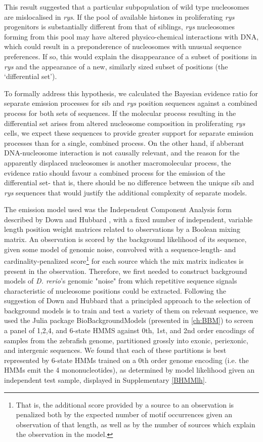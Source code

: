 This result suggested that a particular subpopulation of wild type nucleosomes are mislocalised in \textit{rys}. If the pool of available histones in proliferating \textit{rys} progenitors is substantially different from that of siblings, \textit{rys} nucleosomes forming from this pool may have altered physico-chemical interactions with DNA, which could result in a preponderence of nucleosomes with unusual sequence preferences. If so, this would explain the disappearance of a subset of positions in \textit{rys} and the appearance of a new, similarly sized subset of positions (the `differential set').

To formally address this hypothesis, we calculated the Bayesian evidence ratio for separate emission processes for sib and \textit{rys} position sequences against a combined process for both sets of sequences. If the molecular process resulting in the differential set arises from altered nucleosome composition in proliferating \textit{rys} cells, we expect these sequences to provide greater support for separate emission processes than for a single, combined process. On the other hand, if abberant DNA-nucleosome interaction is not causally relevant, and the reason for the apparently displaced nucleosomes is another macromolecular process, the evidence ratio should favour a combined process for the emission of the differential set- that is, there should be no difference between the unique sib and \textit{rys} sequences that would justify the additional complexity of separate models.

The emission model used was the Independent Component Analysis form described by Down and Hubbard \cite{Down2005}, with a fixed number of independent, variable length position weight matrices related to observations by a Boolean mixing matrix. An observation is scored by the background likelihood of its sequence, given some model of genomic noise, convolved with a sequence-length- and cardinality-penalized score\footnote{That is, the additional score provided by a source to an observation is penalized both by the expected number of motif occurrences given an observation of that length, as well as by the number of sources which explain the observation in the model.} for each source which the mix matrix indicates is present in the observation. Therefore, we first needed to construct background models of \textit{D. rerio}'s genomic "noise" from which repetitive sequence signals characteristic of nucleosome positions could be extracted. Following the suggestion of Down and Hubbard \cite{Down2005} that a principled approach to the selection of background models is to train and test a variety of them on relevant sequence, we used the Julia package BioBackgroundModels (presented in \autoref{ch:BBM}) to screen a panel of 1,2,4, and 6-state HMMS against  0th, 1st, and 2nd order encodings of samples from the zebrafish genome, partitioned grossly into exonic, periexonic, and intergenic sequences. We found that each of these partitions is best represented by 6-state HMMs trained on a 0th order genome encoding (i.e. the HMMs emit the 4 mononucleotides), as determined by model likelihood given an independent test sample, displayed in Supplementary \autoref{BHMMlh}.

